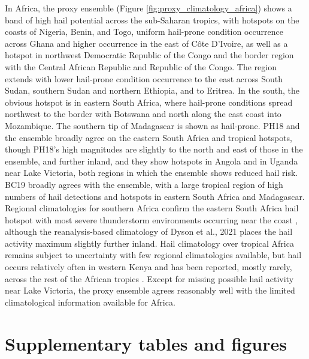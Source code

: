 \documentclass[pdflatex, sn-nature]{sn-jnl}\usepackage[]{graphicx}\usepackage[]{xcolor}
\begin{document}
In Africa, the proxy ensemble (Figure \ref{fig:proxy_climatology_africa}) shows
a band of high hail potential across the sub-Saharan tropics, with hotspots on
the coasts of Nigeria, Benin, and Togo, uniform hail-prone condition occurrence
across Ghana and higher occurrence in the east of C\^ote D'Ivoire, as well as a
hotspot in northwest Democratic Republic of the Congo and the border region with
the Central African Republic and Republic of the Congo. The region extends with
lower hail-prone condition occurrence to the east across South Sudan, southern
Sudan and northern Ethiopia, and to Eritrea. In the south, the obvious hotspot
is in eastern South Africa, where hail-prone conditions spread northwest to the
border with Botswana and north along the east coast into Mozambique. The
southern tip of Madagascar is shown as hail-prone. PH18 and the ensemble broadly
agree on the eastern South Africa and tropical hotspots, though PH18's high
magnitudes are slightly to the north and east of those in the ensemble, and
further inland, and they show hotspots in Angola and in Uganda near Lake
Victoria, both regions in which the ensemble shows reduced hail risk. BC19
broadly agrees with the ensemble, with a large tropical region of high numbers
of hail detections and hotspots in eastern South Africa and Madagascar. Regional
climatologies for southern Africa confirm the eastern South Africa hail hotspot
\citep{Dyson_IJC_2021, Punge_NHESS_2023} with most severe thunderstorm
environments occurring near the coast \citep{Blamey_CD_2017}, although the
reanalysis-based climatology of Dyson et al., 2021 \cite{Dyson_IJC_2021} places
the hail activity maximum slightly further inland. Hail climatology over
tropical Africa remains subject to uncertainty \citep{Bang_JAMC_2019,
Ni_JAMC_2017} with few regional climatologies available, but hail occurs
relatively often in western Kenya \citep{Stephens_AFM_1992, Frisby_JAMC_1967}
and has been reported, mostly rarely, across the rest of the African tropics
\citep{Frisby_JAMC_1967}. Except for missing possible hail activity near Lake
Victoria, the proxy ensemble agrees reasonably well with the limited
climatological information available for Africa.

\FloatBarrier

\newpage
\section{Supplementary tables and figures}
\label{sec:supp_figures}
\end{document}

